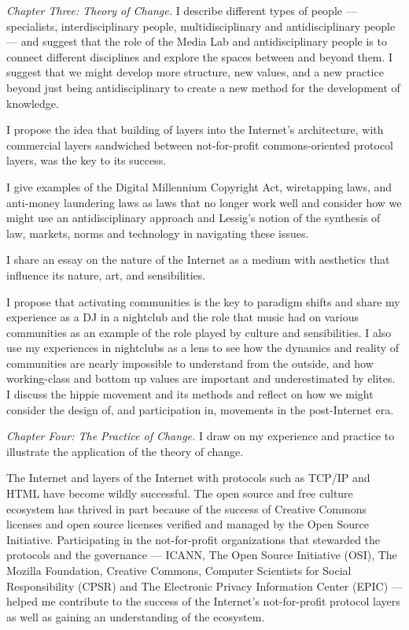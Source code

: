 \emph{Chapter Three: Theory of Change.} I describe different types of people --- specialists, interdisciplinary people, multidisciplinary and antidisciplinary people --- and suggest that the role of the Media Lab and antidisciplinary people is to connect different disciplines and explore the spaces between and beyond them. I suggest that we might develop more structure, new values, and a new practice beyond just being antidisciplinary to create a new method for the development of knowledge.

I propose the idea that building of layers into the Internet's architecture, with commercial layers sandwiched between not-for-profit commons-oriented protocol layers, was the key to its success.

I give examples of the Digital Millennium Copyright Act, wiretapping laws, and anti-money laundering laws as laws that no longer work well and consider how we might use an antidisciplinary approach and Lessig's notion of the synthesis of law, markets, norms and technology in navigating these issues.

I share an essay on the nature of the Internet as a medium with aesthetics that influence its nature, art, and sensibilities.

I propose that activating communities is the key to paradigm shifts and share my experience as a DJ in a nightclub and the role that music had on various communities as an example of the role played by culture and sensibilities. I also use my experiences in nightclubs as a lens to see how the dynamics and reality of communities are nearly impossible to understand from the outside, and how working-class and bottom up values are important and underestimated by elites. I discuss the hippie movement and its methods and reflect on how we might consider the design of, and participation in, movements in the post-Internet era.

\emph{Chapter Four: The Practice of Change.} I draw on my experience and practice to illustrate the application of the theory of change.

The Internet and layers of the Internet with protocols such as \ac{TCP/IP} and \ac{HTML} have become wildly successful. The open source and free culture ecosystem has thrived in part because of the success of Creative Commons licenses and open source licenses verified and managed by the Open Source Initiative. Participating in the not-for-profit organizations that stewarded the protocols and the governance --- \ac{ICANN}, The Open Source Initiative (OSI), The Mozilla Foundation, Creative Commons, Computer Scientists for Social Responsibility (CPSR) and The Electronic Privacy Information Center (EPIC) --- helped me contribute to the success of the Internet's not-for-profit protocol layers as well as gaining an understanding of the ecosystem.

